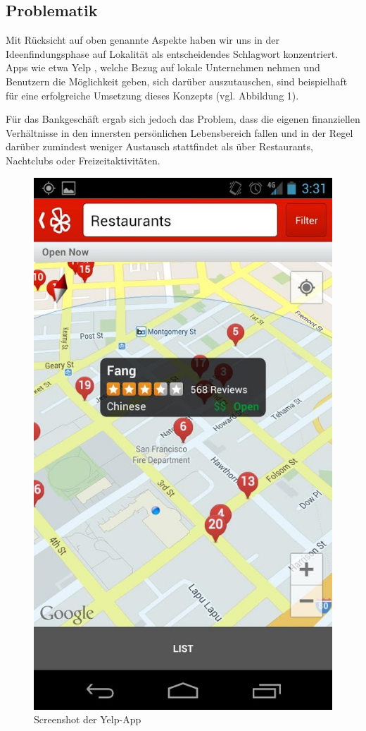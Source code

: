 
\subsection{Problematik}
	Mit Rücksicht auf oben genannte Aspekte haben wir uns in der Ideenfindungsphase auf Lokalität als entscheidendes Schlagwort konzentriert. Apps wie etwa Yelp \citep{Yelp14}, welche Bezug auf lokale Unternehmen nehmen und Benutzern die Möglichkeit geben, sich darüber auszutauschen, sind beispielhaft für eine erfolgreiche Umsetzung dieses Konzepts (vgl. Abbildung 1).
	
	Für das Bankgeschäft ergab sich jedoch das Problem, dass die eigenen finanziellen Verhältnisse in den innersten persönlichen Lebensbereich fallen und in der Regel darüber zumindest weniger Austausch stattfindet als über Restaurants, Nachtclubs oder Freizeitaktivitäten. 

\begin{figure}[h]
	\centering
	\includegraphics[scale=0.2]{Pictures/Yelp}
	\caption{Screenshot der Yelp-App \label{fig:Yelp}}
\end{figure}

